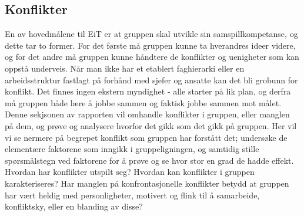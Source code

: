 \subsection{Konflikter}

En av hovedmålene til EiT er at gruppen skal utvikle sin samspillkompetanse\cite{eitlaeringsmaal}, og dette tar to former.
For det første må gruppen kunne ta hverandres ideer videre, og for det andre må gruppen kunne håndtere de konflikter og uenigheter som kan oppstå underveis.
Når man ikke har et etablert faghierarki eller en arbeidsstruktur fastlagt på forhånd med sjefer og ansatte kan det bli grobunn for konflikt. Det finnes ingen ekstern myndighet - alle starter på lik plan, og derfra må gruppen både lære å jobbe sammen og faktisk jobbe sammen mot målet. Denne sekjsonen av rapporten vil omhandle konflikter i gruppen, eller manglen på dem, og prøve og analysere hvorfor det gikk som det gikk på gruppen. Her vil vi se nermere på begrepet konflikt som gruppen har forstått det; undersøke de elementære faktorene som inngikk i gruppeligningen, og samtidig stille spørsmålstegn ved faktorene for å prøve og se hvor stor en grad de hadde effekt. Hvordan har konflikter utspilt seg? Hvordan kan konflikter i gruppen karakteriseres? Har manglen på konfrontasjonelle konflikter betydd at gruppen har vært heldig med personligheter, motivert og flink til å samarbeide, konfliktsky, eller en blanding av disse?
